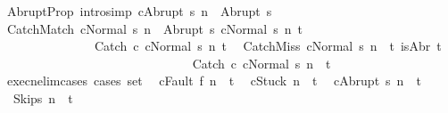 \begin{isabellebody}
\isanewline
{\isacharbar}\ AbruptProp\ {\isacharbrackleft}intro{\isacharcomma}simp{\isacharbrackright}{\isacharcolon}\ {\isachardoublequoteopen}{\isasymGamma}{\isasymturnstile}{\isasymlangle}c{\isacharcomma}Abrupt\ s{\isasymrangle}\ {\isacharequal}n{\isasymRightarrow}\ \ Abrupt\ s{\isachardoublequoteclose}\isanewline
\ \ \isanewline
{\isacharbar}\ CatchMatch{\isacharcolon}\ {\isachardoublequoteopen}{\isasymlbrakk}{\isasymGamma}{\isasymturnstile}{\isasymlangle}cNormal\ s{\isasymrangle}\ {\isacharequal}n{\isasymRightarrow}\ \ Abrupt\ s{\isacharprime}{\isacharsemicolon}\ {\isasymGamma}{\isasymturnstile}{\isasymlangle}cNormal\ s{\isacharprime}{\isasymrangle}\ {\isacharequal}n{\isasymRightarrow}\ t{\isasymrbrakk}\isanewline
\ \ \ \ \ \ \ \ \ \ \ \ \ \ \ {\isasymLongrightarrow}\isanewline
\ \ \ \ \ \ \ \ \ \ \ \ \ \ \ {\isasymGamma}{\isasymturnstile}{\isasymlangle}Catch\ c\ cNormal\ s{\isasymrangle}\ {\isacharequal}n{\isasymRightarrow}\ t{\isachardoublequoteclose}\ \isanewline
{\isacharbar}\ CatchMiss{\isacharcolon}\ {\isachardoublequoteopen}{\isasymlbrakk}{\isasymGamma}{\isasymturnstile}{\isasymlangle}cNormal\ s{\isasymrangle}\ {\isacharequal}n{\isasymRightarrow}\ \ t{\isacharsemicolon}\ {\isasymnot}isAbr\ t{\isasymrbrakk}\isanewline
\ \ \ \ \ \ \ \ \ \ \ \ \ \ \ {\isasymLongrightarrow}\isanewline
\ \ \ \ \ \ \ \ \ \ \ \ \ \ \ {\isasymGamma}{\isasymturnstile}{\isasymlangle}Catch\ c\ cNormal\ s{\isasymrangle}\ {\isacharequal}n{\isasymRightarrow}\ \ t{\isachardoublequoteclose}\isanewline
\ \isanewline
{}\isamarkupfalse%
\ execn{\isacharunderscore}elim{\isacharunderscore}cases\ {\isacharbrackleft}cases\ set{\isacharbrackright}{\isacharcolon}\isanewline
\ \ {\isachardoublequoteopen}{\isasymGamma}{\isasymturnstile}{\isasymlangle}c{\isacharcomma}Fault\ f{\isasymrangle}\ {\isacharequal}n{\isasymRightarrow}\ \ t{\isachardoublequoteclose}\isanewline
\ \ {\isachardoublequoteopen}{\isasymGamma}{\isasymturnstile}{\isasymlangle}c{\isacharcomma}Stuck{\isasymrangle}\ {\isacharequal}n{\isasymRightarrow}\ \ t{\isachardoublequoteclose}\isanewline
\ \ {\isachardoublequoteopen}{\isasymGamma}{\isasymturnstile}{\isasymlangle}c{\isacharcomma}Abrupt\ s{\isasymrangle}\ {\isacharequal}n{\isasymRightarrow}\ \ t{\isachardoublequoteclose}\isanewline
\ \ {\isachardoublequoteopen}{\isasymGamma}{\isasymturnstile}{\isasymlangle}Skip{\isacharcomma}s{\isasymrangle}\ {\isacharequal}n{\isasymRightarrow}\ \ t{\isachardoublequoteclose}\isanewline

\end{isabellebody}
